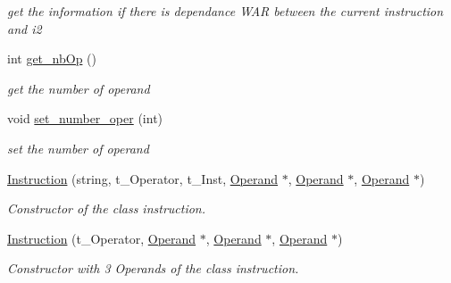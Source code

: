 \begin{DoxyCompactItemize}
\begin{DoxyCompactList}\small\item\em get the information if there is dependance W\+AR between the current instruction and i2 ~\newline
 \end{DoxyCompactList}\item 
int \mbox{\hyperlink{class_instruction_a044a281355f25375a7765f24bdf614f3}{get\+\_\+nb\+Op}} ()
\begin{DoxyCompactList}\small\item\em get the number of operand ~\newline
 \end{DoxyCompactList}\item 
\mbox{\label{class_instruction_a6ff2d531dffa43d3db22194459336d33}} 
void \mbox{\hyperlink{class_instruction_a6ff2d531dffa43d3db22194459336d33}{set\+\_\+number\+\_\+oper}} (int)
\begin{DoxyCompactList}\small\item\em set the number of operand \end{DoxyCompactList}\item 
\mbox{\label{class_instruction_a055c483afc0512b68f6211fdbb6774ba}} 
\mbox{\hyperlink{class_instruction_a055c483afc0512b68f6211fdbb6774ba}{Instruction}} (string, t\+\_\+\+Operator, t\+\_\+\+Inst, \mbox{\hyperlink{class_operand}{Operand}} $\ast$, \mbox{\hyperlink{class_operand}{Operand}} $\ast$, \mbox{\hyperlink{class_operand}{Operand}} $\ast$)
\begin{DoxyCompactList}\small\item\em Constructor of the class instruction. \end{DoxyCompactList}\item 
\mbox{\label{class_instruction_a2f1ed1606d4090b8a4c255e3af9e34c8}} 
\mbox{\hyperlink{class_instruction_a2f1ed1606d4090b8a4c255e3af9e34c8}{Instruction}} (t\+\_\+\+Operator, \mbox{\hyperlink{class_operand}{Operand}} $\ast$, \mbox{\hyperlink{class_operand}{Operand}} $\ast$, \mbox{\hyperlink{class_operand}{Operand}} $\ast$)
\begin{DoxyCompactList}\small\item\em Constructor with 3 Operands of the class instruction. \end{DoxyCompactList}\item 
\mbox{\label{class_instruction_a0b1ed4432c9c5823ee9e522c7d11bb5f}} 

\end{DoxyCompactItemize}
